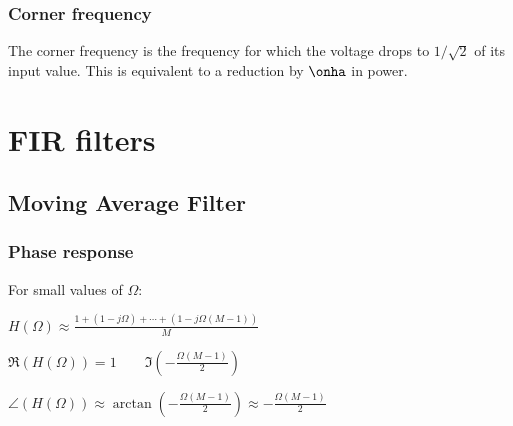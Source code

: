 \documentclass[8pt,a4paper]{scrartcl}
\begin{document}
\begin{multicols*}{3}

\subsubsection{Corner frequency}

The corner frequency is the frequency for which the voltage drops to $1/\sqrt{2}$ of its input value. This is equivalent to a reduction by $\onha$ in power.

\section{FIR filters}



\subsection{Moving Average Filter}





\subsubsection{Phase response}

For small values of $\Omega:$

$H(\Omega)\approx\frac{1+(1-j\Omega)+\cdots+(1-j\Omega(M-1))}{M}$

$\Re(H(\Omega))=1\qquad \Im(-\frac{\Omega(M-1)}{2})$

$\angle(H(\Omega))\approx \arctan\left(-\frac{\Omega(M-1)}{2}\right)\approx -\frac{\Omega(M-1)}{2}$


\end{multicols*}
\end{document}
